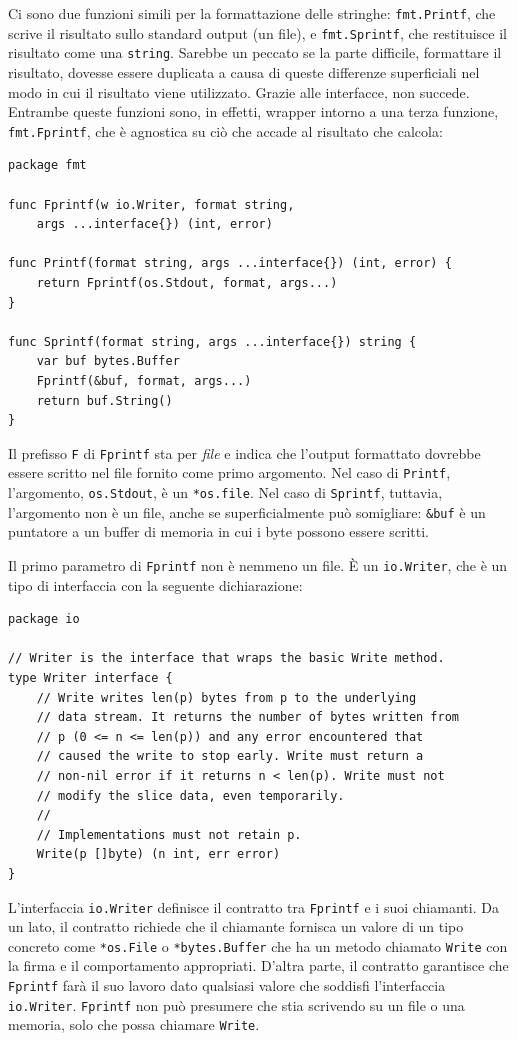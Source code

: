 Ci sono due funzioni simili per la formattazione delle stringhe: \verb|fmt.Printf|, che scrive il risultato sullo standard output (un file), e \verb|fmt.Sprintf|, che restituisce il risultato come una \verb|string|.
Sarebbe un peccato se la parte difficile, formattare il risultato, dovesse essere duplicata a causa di queste differenze superficiali nel modo in cui il risultato viene utilizzato.
Grazie alle interfacce, non succede.
Entrambe queste funzioni sono, in effetti, wrapper intorno a una terza funzione, \verb|fmt.Fprintf|, che è agnostica su ciò che accade al risultato che calcola:
\begin{lstlisting}[frame=single, label={lst:lstlisting6-1.1}]
package fmt

func Fprintf(w io.Writer, format string,
    args ...interface{}) (int, error)

func Printf(format string, args ...interface{}) (int, error) {
    return Fprintf(os.Stdout, format, args...)
}

func Sprintf(format string, args ...interface{}) string {
    var buf bytes.Buffer
    Fprintf(&buf, format, args...)
    return buf.String()
}
\end{lstlisting}
Il prefisso \verb|F| di \verb|Fprintf| sta per \textit{file} e indica che l'output formattato dovrebbe essere scritto nel file fornito come primo argomento.
Nel caso di \verb|Printf|, l'argomento, \verb|os.Stdout|, è un \verb|*os.file|.
Nel caso di \verb|Sprintf|, tuttavia, l'argomento non è un file, anche se superficialmente può somigliare: \verb|&buf| è un puntatore a un buffer di memoria in cui i byte possono essere scritti.

Il primo parametro di \verb|Fprintf| non è nemmeno un file.
È un \verb|io.Writer|, che è un tipo di interfaccia con la seguente dichiarazione:
\begin{lstlisting}[frame=single, label={lst:lstlisting6-1.2}]
package io

// Writer is the interface that wraps the basic Write method.
type Writer interface {
    // Write writes len(p) bytes from p to the underlying
    // data stream. It returns the number of bytes written from
    // p (0 <= n <= len(p)) and any error encountered that
    // caused the write to stop early. Write must return a
    // non-nil error if it returns n < len(p). Write must not
    // modify the slice data, even temporarily.
    //
    // Implementations must not retain p.
    Write(p []byte) (n int, err error)
}
\end{lstlisting}
L'interfaccia \verb|io.Writer| definisce il contratto tra \verb|Fprintf| e i suoi chiamanti.
Da un lato, il contratto richiede che il chiamante fornisca un valore di un tipo concreto come \verb|*os.File| o \verb|*bytes.Buffer| che ha un metodo chiamato \verb|Write| con la firma e il comportamento appropriati.
D'altra parte, il contratto garantisce che \verb|Fprintf| farà il suo lavoro dato qualsiasi valore che soddisfi l'interfaccia \verb|io.Writer|.
\verb|Fprintf| non può presumere che stia scrivendo su un file o una memoria, solo che possa chiamare \verb|Write|.

